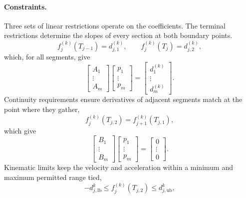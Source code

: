 \paragraph{Constraints.}
Three sets of linear restrictions operate on the coefficients. The terminal restrictions determine the slopes of every section at both boundary points.
\begin{equation}
f_j^{(k)}(T_{j-1}) = d^{(k)}_{j,1}, \qquad f_j^{(k)}(T_j) = d^{(k)}_{j,2},
\label{eq:endpoint}
\end{equation}
which, for all segments, give
\begin{equation}
\begin{bmatrix} A_1\\ \vdots\\ A_m \end{bmatrix}
\begin{bmatrix} p_1\\ \vdots\\ p_m \end{bmatrix}
=
\begin{bmatrix} d_1^{(k)}\\ \vdots\\ d_m^{(k)} \end{bmatrix}.
\label{eq:Aeq}
\end{equation}
Continuity requirements ensure derivatives of adjacent segments match at the point where they gather,
\begin{equation}
f_j^{(k)}(T_{j,2}) = f_{j+1}^{(k)}(T_{j,1}),
\label{eq:cont}
\end{equation}
which give
\begin{equation}
\begin{bmatrix} B_1\\ \vdots\\ B_m \end{bmatrix}
\begin{bmatrix} p_1\\ \vdots\\ p_m \end{bmatrix}
=
\begin{bmatrix} 0\\ \vdots\\ 0 \end{bmatrix}.
\label{eq:Beq}
\end{equation}
Kinematic limits keep the velocity and acceleration within a minimum and maximum permitted range tied,
\begin{equation}
-d^{k}_{j,\mathrm{lb}} \le f_j^{(k)}(T_{j,2}) \le d^{k}_{j,\mathrm{ub}},
\label{eq:bound}
\end{equation}
